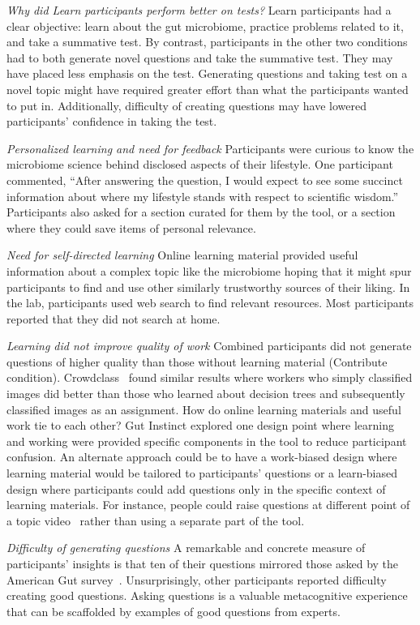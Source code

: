 \textit{Why did Learn participants perform better on tests?}
Learn participants had a clear objective: learn about the gut microbiome, practice problems related to it, and take a summative test. By contrast, participants in the other two conditions had to both generate novel questions and take the summative test. They may have placed less emphasis on the test. Generating questions and taking test on a novel topic might have required greater effort than what the participants wanted to put in. Additionally, difficulty of creating questions may have lowered participants’ confidence in taking the test. 

\textit{Personalized learning and need for feedback}
Participants were curious to know the microbiome science behind disclosed aspects of their lifestyle. One participant commented, “After answering the question, I would expect to see some succinct information about where my lifestyle stands with respect to scientific wisdom.” Participants also asked for a section curated for them by the tool, or a section where they could save items of personal relevance.
 
\textit{Need for self-directed learning}
Online learning material provided useful information about a complex topic like the microbiome hoping that it might spur participants to find and use other similarly trustworthy sources of their liking. In the lab, participants used web search to find relevant resources. Most participants reported that they did not search at home. 

\textit{Learning did not improve quality of work}
Combined participants did not generate questions of higher quality than those without learning material (Contribute condition). Crowdclass~\cite{Lee2016} found similar results where workers who simply classified images did better than those who learned about decision trees and subsequently classified images as an assignment. How do online learning materials and useful work tie to each other? Gut Instinct explored one design point where learning and working were provided specific components in the tool to reduce participant confusion. An alternate approach could be to have a work-biased design where learning material would be tailored to participants’ questions or a learn-biased design where participants could add questions only in the specific context of learning materials. For instance, people could raise questions at different point of a topic video~\cite{Lee2015b} rather than using a separate part of the tool.
 
\textit{Difficulty of generating questions}
A remarkable and concrete measure of participants’ insights is that ten of their questions mirrored those asked by the American Gut survey~\cite{KnightLab2016}. Unsurprisingly, other participants reported difficulty creating good questions. Asking questions is a valuable metacognitive experience that can be scaffolded by examples of good questions from experts. 

